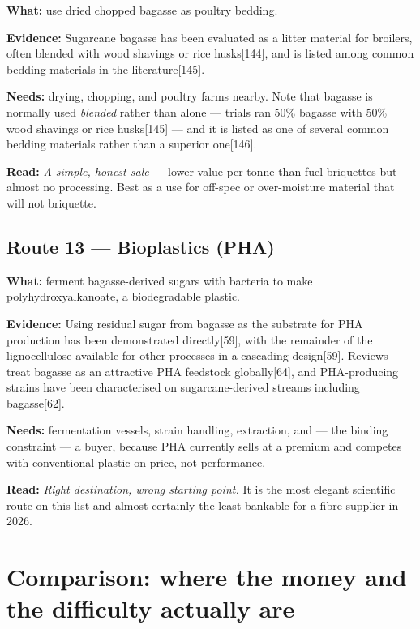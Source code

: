 \documentclass[11pt]{article}
\newcommand{\src}[1]{[#1]}
\begin{document}
\textbf{What:} use dried chopped bagasse as poultry bedding.

\textbf{Evidence:} Sugarcane bagasse has been evaluated as a litter material
for broilers, often blended with wood shavings or rice husks\src{144}, and is
listed among common bedding materials in the literature\src{145}.

\textbf{Needs:} drying, chopping, and poultry farms nearby. Note that bagasse is
normally used \emph{blended} rather than alone --- trials ran 50\% bagasse with
50\% wood shavings or rice husks\src{145} --- and it is listed as one of several
common bedding materials rather than a superior one\src{146}.

\textbf{Read:} \emph{A simple, honest sale} --- lower value per tonne than fuel
briquettes but almost no processing. Best as a use for off-spec or
over-moisture material that will not briquette.

\subsection{Route 13 --- Bioplastics (PHA)}

\textbf{What:} ferment bagasse-derived sugars with bacteria to make
polyhydroxyalkanoate, a biodegradable plastic.

\textbf{Evidence:} Using residual sugar from bagasse as the substrate for PHA
production has been demonstrated directly\src{59}, with the remainder of the
lignocellulose available for other processes in a cascading design\src{59}.
Reviews treat bagasse as an attractive PHA feedstock globally\src{64}, and
PHA-producing strains have been characterised on sugarcane-derived streams
including bagasse\src{62}.

\textbf{Needs:} fermentation vessels, strain handling, extraction, and --- the
binding constraint --- a buyer, because PHA currently sells at a premium and
competes with conventional plastic on price, not performance.

\textbf{Read:} \emph{Right destination, wrong starting point.} It is the most
elegant scientific route on this list and almost certainly the least
bankable for a fibre supplier in 2026.

\section{Comparison: where the money and the difficulty actually are}
\end{document}
